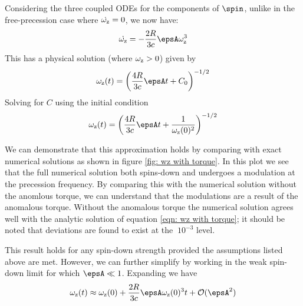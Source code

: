 \documentclass[/home/greg/Thesis/main/main.tex]{subfiles}
\begin{document}
Considering the three coupled ODEs for the components of $\spin$, unlike in the
free-precession case where $\dot{\omega_{\mathrm{z}}} = 0$, we now have:
\begin{align}
\dot{\wz} = -\frac{2R}{3c} \epsA \wz^{3}
\end{align}
This has a physical solution (where $\omega_{\mathrm{z}} > 0$) given by 
\begin{align}
\wz(t) = \left(\frac{4R}{3c} \epsA t + C_0 \right)^{-1/2}
\end{align}
Solving for $C$ using the initial condition
\begin{align}
\wz(t) = \left(\frac{4R}{3c} \epsA t + \frac{1}{\wz(0)^{2}}\right)^{-1/2}
\label{eqn: wz with torque}
\end{align}

We can demonstrate that this approximation holds by comparing with exact
numerical solutions as shown in figure \ref{fig: wz with torque}. In this plot
we see that the full numerical solution both spins-down and undergoes a
modulation at the precession frequency. By comparing this with the numerical
solution without the anomlous torque, we can understand that the modulations
are a result of the anomalous torque. Without the anomalous torque the numerical
solution agrees well with the analytic solution of equation 
\eqref{eqn: wz with torque}; it should be noted that deviations are found
to exist at the $~10^{-3}$ level.


This result holds for any spin-down strength provided the assumptions listed
above are met. However, we can further simplify by working in the weak 
spin-down limit for which $\epsA \ll 1$. Expanding we have
\begin{equation}
\wz(t) \approx \wz(0) + \frac{2R}{3c}\epsA \wz(0)^{3} t + \mathcal{O}(\epsA^{2})
\end{equation}
\end{document}
